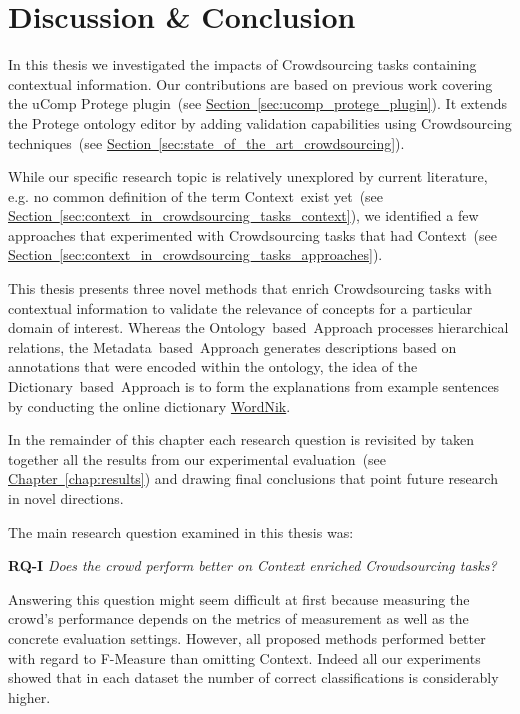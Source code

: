 
\chapter{Discussion \& Conclusion}\label{chap:discussion_and_conclusion}
In this thesis we investigated the impacts of Crowdsourcing tasks containing contextual information. Our contributions
are based on previous work covering the uComp Protege plugin~(see \hyperref[sec:ucomp_protege_plugin]{Section~\ref*{sec:ucomp_protege_plugin}}). It extends the Protege ontology editor by adding validation capabilities using Crowdsourcing techniques~(see \hyperref[sec:state_of_the_art_crowdsourcing]{Section~\ref*{sec:state_of_the_art_crowdsourcing}}).  

While our specific research topic is relatively unexplored by current literature, e.g. no common definition of the term \guillemotright Context\guillemotleft~exist yet~(see \hyperref[sec:context_in_crowdsourcing_tasks_context]{Section~\ref*{sec:context_in_crowdsourcing_tasks_context}}),
we identified a few approaches that experimented with Crowdsourcing tasks that had Context~(see \hyperref[sec:context_in_crowdsourcing_tasks_approaches]{Section~\ref*{sec:context_in_crowdsourcing_tasks_approaches}}). 

This thesis presents three novel methods that enrich Crowdsourcing tasks with contextual information to validate the relevance of concepts for a particular domain of interest. Whereas the Ontology~based~Approach processes hierarchical relations, the Metadata~based~Approach generates descriptions based on annotations that were encoded within the ontology, the idea of the Dictionary~based~Approach is to form the explanations from example sentences by conducting the online dictionary \hyperref[sec:wordnik]{WordNik}.

In the remainder of this chapter each research question is revisited by taken together all the results from our experimental evaluation~(see \hyperref[chap:results]{Chapter~\ref*{chap:results}}) and drawing final conclusions that point future research in novel directions. 

The main research question examined in this thesis was:
 
\textbf{RQ-I} \emph{Does the crowd perform better on Context enriched Crowdsourcing tasks?}

Answering this question might seem difficult at first because measuring the crowd's performance depends on the metrics of measurement as well as the concrete evaluation settings. However, all proposed methods performed better with regard to F-Measure than omitting Context. Indeed all our experiments showed that in each dataset the number of correct classifications is considerably higher. 

